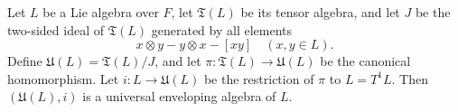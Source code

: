 Let $L$ be a Lie algebra over $F$, let $\mathfrak{T}(L)$ be its tensor algebra, and let $J$ be the two-sided ideal of $\mathfrak{T}(L)$ generated by all elements
$$
x \otimes y - y \otimes x - [xy] \quad (x, y \in L).
$$
Define $\mathfrak{U}(L) = \mathfrak{T}(L)/J$, and let $\pi: \mathfrak{T}(L) \to \mathfrak{U}(L)$ be the canonical homomorphism. Let $i: L \to \mathfrak{U}(L)$ be the restriction of $\pi$ to $L = T^1L$. Then $(\mathfrak{U}(L), i)$ is a universal enveloping algebra of $L$.
